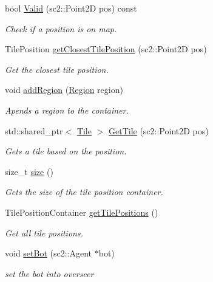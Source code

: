 \begin{DoxyCompactItemize}
bool \hyperlink{classOverseer_1_1Map_a0cd63b3a16beab9b4cf01aa1b6adad8f}{Valid} (sc2\+::\+Point2D pos) const 
\begin{DoxyCompactList}\small\item\em Check if a position is on map. \end{DoxyCompactList}\item 
Tile\+Position \hyperlink{classOverseer_1_1Map_aebebc1ac43ea86747ebc38f2ee0d821d}{get\+Closest\+Tile\+Position} (sc2\+::\+Point2D pos)
\begin{DoxyCompactList}\small\item\em Get the closest tile position. \end{DoxyCompactList}\item 
void \hyperlink{classOverseer_1_1Map_afa19b5f826a5a4d37258e000bfa646a9}{add\+Region} (\hyperlink{classOverseer_1_1Region}{Region} region)
\begin{DoxyCompactList}\small\item\em Apends a region to the container. \end{DoxyCompactList}\item 
std\+::shared\+\_\+ptr$<$ \hyperlink{classOverseer_1_1Tile}{Tile} $>$ \hyperlink{classOverseer_1_1Map_a12059a2ddd7ecc91c2a7bd643bae6813}{Get\+Tile} (sc2\+::\+Point2D pos)
\begin{DoxyCompactList}\small\item\em Gets a tile based on the position. \end{DoxyCompactList}\item 
size\+\_\+t \hyperlink{classOverseer_1_1Map_a29777413d8ac109aeb6f974a7b2fc25c}{size} ()
\begin{DoxyCompactList}\small\item\em Gets the size of the tile position container. \end{DoxyCompactList}\item 
Tile\+Position\+Container \hyperlink{classOverseer_1_1Map_a9e3000cfd9170cc7f6a70988fccd3af9}{get\+Tile\+Positions} ()
\begin{DoxyCompactList}\small\item\em Get all tile positions. \end{DoxyCompactList}\item 
void \hyperlink{classOverseer_1_1Map_a5fe859c4edbfc92971ad2ad38d69ff90}{set\+Bot} (sc2\+::\+Agent $\ast$bot)
\begin{DoxyCompactList}\small\item\em set the bot into overseer \end{DoxyCompactList}\item 

\end{DoxyCompactItemize}
